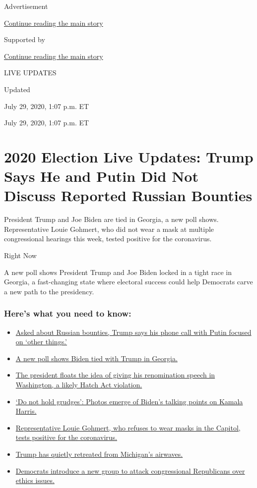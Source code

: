 Advertisement

\protect\hyperlink{after-top}{Continue reading the main story}

Supported by

\protect\hyperlink{after-sponsor}{Continue reading the main story}

LIVE UPDATES

Updated~

July 29, 2020, 1:07 p.m. ET

July 29, 2020, 1:07 p.m. ET

\hypertarget{2020-election-live-updates-trump-says-he-and-putin-did-not-discuss-reported-russian-bounties}{%
\section{2020 Election Live Updates: Trump Says He and Putin Did Not
Discuss Reported Russian
Bounties}\label{2020-election-live-updates-trump-says-he-and-putin-did-not-discuss-reported-russian-bounties}}

President Trump and Joe Biden are tied in Georgia, a new poll shows.
Representative Louie Gohmert, who did not wear a mask at multiple
congressional hearings this week, tested positive for the coronavirus.

Right Now

A new poll shows President Trump and Joe Biden locked in a tight race in
Georgia, a fast-changing state where electoral success could help
Democrats carve a new path to the presidency.

\hypertarget{heres-what-you-need-to-know}{%
\subsubsection{Here's what you need to
know:}\label{heres-what-you-need-to-know}}

\begin{itemize}
\tightlist
\item
  \protect\hyperlink{link-1550d1d7}{Asked about Russian bounties, Trump
  says his phone call with Putin focused on `other things.'}
\item
  \protect\hyperlink{link-44f0348}{A new poll shows Biden tied with
  Trump in Georgia.}
\item
  \protect\hyperlink{link-7eba6945}{The president floats the idea of
  giving his renomination speech in Washington, a likely Hatch Act
  violation.}
\item
  \protect\hyperlink{link-8e78b96}{`Do not hold grudges': Photos emerge
  of Biden's talking points on Kamala Harris.}
\item
  \protect\hyperlink{link-64f2c322}{Representative Louie Gohmert, who
  refuses to wear masks in the Capitol, tests positive for the
  coronavirus.}
\item
  \protect\hyperlink{link-389bb2b4}{Trump has quietly retreated from
  Michigan's airwaves.}
\item
  \protect\hyperlink{link-51719535}{Democrats introduce a new group to
  attack congressional Republicans over ethics issues.}
\end{itemize}

